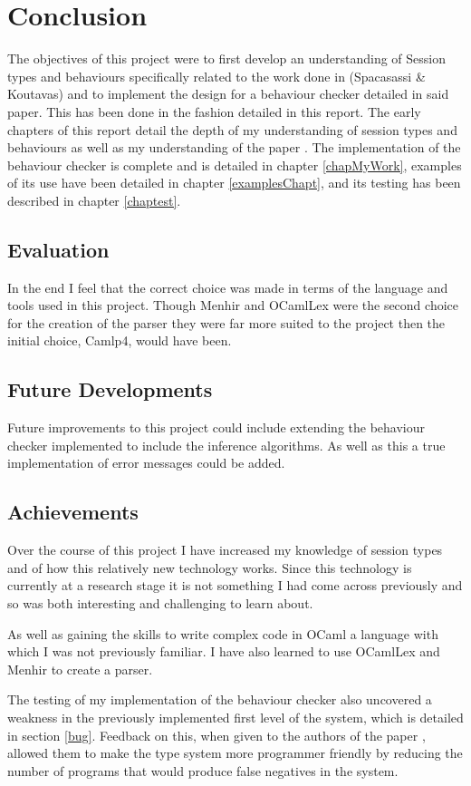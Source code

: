 \chapter{Conclusion}

The objectives of this project were to first develop an understanding of Session types and behaviours specifically related to the work done in (Spacasassi \& Koutavas)\cite{paper1} and to implement the design for a behaviour checker detailed in said paper. This has been done in the fashion detailed in this report. The early chapters of this report detail the depth of my understanding of session types and behaviours as well as my understanding of the paper \cite{paper1}. The implementation of the behaviour checker is complete and is detailed in chapter \ref{chapMyWork}, examples of its use have been detailed in chapter \ref{examplesChapt}, and its testing has been described in chapter \ref{chaptest}. 

\section{Evaluation}

In the end I feel that the correct choice was made in terms of the language and tools used in this project. Though Menhir and OCamlLex were the second choice for the creation of the parser they were far more suited to the project then the initial choice, Camlp4, would have been. 

\section{Future Developments}

Future improvements to this project could include extending the behaviour checker implemented to include the inference algorithms. As well as this a true implementation of error messages could be added. 

\section{Achievements}

Over the course of this project I have increased my knowledge of session types and of how this relatively new technology works. Since this technology is currently at a research stage it is not something I had come across previously and so was both interesting and challenging to learn about.

As well as gaining the skills to write complex code in OCaml a language with which I was not previously familiar. I have also learned to use OCamlLex and Menhir to create a parser. 

The testing of my implementation of the behaviour checker also uncovered a weakness in the previously implemented first level of the system, which is detailed in section \ref{bug}. Feedback on this, when given to the authors of the paper \cite{paper1}, allowed them to make the type system more programmer friendly by reducing the number of programs that would produce false negatives in the system.


